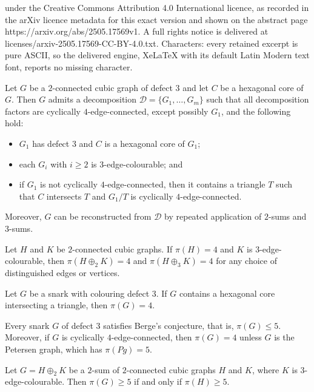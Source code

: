 \documentclass[10pt,a4paper]{amsart}
\begin{document}
under the Creative Commons Attribution 4.0 International licence, as recorded in the arXiv licence metadata for this exact version and shown on the abstract page https://arxiv.org/abs/2505.17569v1. A full rights notice is delivered at licenses/arxiv-2505.17569-CC-BY-4.0.txt. Characters: every retained excerpt is pure ASCII, so the delivered engine, XeLaTeX with its default Latin Modern text font, reports no missing character.
\begin{theorem}\label{thm:decomp-def3}
Let $G$ be a $2$-connected cubic graph of defect $3$ and let
$C$ be a hexagonal core of $G$. Then $G$ admits a decomposition
$\mathcal{D}=\{G_1,\dots,G_m\}$ such that all decomposition
factors are cyclically $4$-edge-connected, except possibly
$G_1$, and the following hold:
\begin{itemize}
\item[{\rm (i)}] $G_1$ has defect $3$ and $C$ is a
    hexagonal core of $G_1$;
\item[{\rm (ii)}] each $G_i$ with $i\ge 2$ is
    $3$-edge-colourable; and
\item[{\rm (iii)}] if $G_1$ is not cyclically
    $4$-edge-connected, then it contains a triangle $T$
    such that $C$ intersects $T$ and $G_1/T$ is cyclically
    $4$-edge-connected.
\end{itemize}
Moreover, $G$ can be reconstructed from $\mathcal{D}$ by
repeated application of $2$-sums and $3$-sums.
\end{theorem}

\begin{lemma}\label{lem:2+3-sum-4cover}
Let $H$ and $K$ be $2$-connected cubic graphs. If $\pi(H)=4$
and $K$ is $3$-edge-colourable, then $\pi(H\oplus_2 K)=4$ and
$\pi(H\oplus_3 K)=4$ for any choice of distinguished edges or
vertices.
\end{lemma}

\begin{theorem}\label{thm:triancore}
Let $G$ be a snark with colouring defect $3$. If $G$ contains a hexagonal
core intersecting a triangle, then $\pi(G)=4$.
\end{theorem}

\begin{theorem}\label{thm:pmi-c4c}
Every snark $G$ of defect $3$ satisfies Berge's conjecture,
that is, $\pi(G)\le 5$. Moreover, if $G$ is cyclically
$4$-edge-connected, then $\pi(G)=4$ unless $G$ is the Petersen
graph, which has $\pi(Pg)=5$.
\end{theorem}

\begin{lemma}\label{lem:2sum}
Let $G=H\oplus_2 K$ be a $2$-sum of $2$-connected cubic graphs
$H$ and $K$, where $K$ is $3$-edge-colourable. Then $\pi(G)\ge
5$ if and only if $\pi(H)\ge 5$.
\end{lemma}
\end{document}
